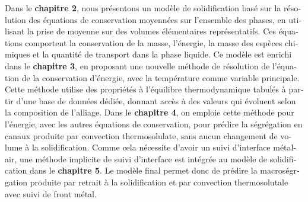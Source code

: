 \begin{otherlanguage}{french}
{Dans le \textbf{chapitre 2}, nous présentons un modèle de solidification
basé sur la résolution des équations de conservation moyennées sur l'ensemble des phases, en utilisant la prise de moyenne
sur des volumes élémentaires représentatifs. Ces équations comportent la conservation de la masse, l'énergie, la masse des espèces
chimiques et la quantité de transport dans la phase liquide. Ce modèle est enrichi dans le \textbf{chapitre 3}, 
en proposant une nouvelle méthode de résolution de l'équation de la conservation d'énergie, avec la température comme variable
principale. Cette méthode utilise des propriétés à l'équilibre thermodynamique tabulés à partir d'une base de données dédiée, donnant accès à
des valeurs qui évoluent selon la composition de l'alliage. Dans le \textbf{chapitre 4}, on emploie cette méthode pour l'énergie,
avec les autres équations de conservation, pour prédire la ségrégation en canaux produite par convection thermosolulate, sans aucun 
changement de volume à la solidification. Comme cela nécessite d'avoir un suivi d'interface métal-air, une méthode implicite de suivi d'interface
est intégrée au modèle de solidification dans le \textbf{chapitre 5}. Le modèle final permet donc de prédire la macroségrgation produite
par retrait à la solidification et par convection thermosolutale avec suivi de front métal.  

}
\end{otherlanguage}